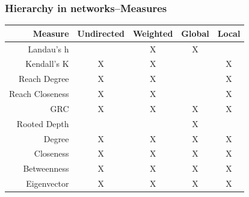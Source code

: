\documentclass{beamer}
\begin{document}
\begin{frame}\frametitle{Hierarchy in networks--Measures}
	\begin{table}
		\begin{tabular}{| r || c | c | c | c |}
			\hline
			Measure & Undirected & Weighted & Global & Local \\
			\hline
			Landau's h & & X& X& \\
			Kendall's K & X& X& &X\\
			Reach Degree & X& X& &X\\
			Reach Closeness & X& X& &X\\
			GRC & X& X& X&X\\
			Rooted Depth & & & X&\\
			Degree & X& X& X&X\\
			Closeness & X& X& X&X\\
			Betweenness & X& X& X&X\\
			Eigenvector &  X& X& X& X \\
			\hline
		\end{tabular}
	\end{table}
\end{frame}
\end{document}

